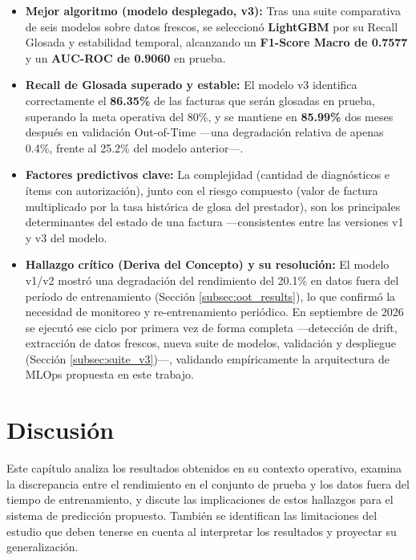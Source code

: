 \documentclass[12pt,letterpaper]{report}
\begin{document}
\begin{tcolorbox}[colback=blue!5, colframe=minsalud, fonttitle=\bfseries, title=Hallazgos Principales del Modelo Predictivo]
\begin{itemize}
    \item \textbf{Mejor algoritmo (modelo desplegado, v3):} Tras una suite comparativa de seis modelos sobre datos frescos, se seleccionó \textbf{LightGBM} por su Recall Glosada y estabilidad temporal, alcanzando un \textbf{F1-Score Macro de 0.7577} y un \textbf{AUC-ROC de 0.9060} en prueba.
    \item \textbf{Recall de Glosada superado y estable:} El modelo v3 identifica correctamente el \textbf{86.35\%} de las facturas que serán glosadas en prueba, superando la meta operativa del 80\%, y se mantiene en \textbf{85.99\%} dos meses después en validación Out-of-Time —una degradación relativa de apenas 0.4\%, frente al 25.2\% del modelo anterior—.
    \item \textbf{Factores predictivos clave:} La complejidad (cantidad de diagnósticos e ítems con autorización), junto con el riesgo compuesto (valor de factura multiplicado por la tasa histórica de glosa del prestador), son los principales determinantes del estado de una factura —consistentes entre las versiones v1 y v3 del modelo.
    \item \textbf{Hallazgo crítico (Deriva del Concepto) y su resolución:} El modelo v1/v2 mostró una degradación del rendimiento del 20.1\% en datos fuera del período de entrenamiento (Sección \ref{subsec:oot_results}), lo que confirmó la necesidad de monitoreo y re-entrenamiento periódico. En septiembre de 2026 se ejecutó ese ciclo por primera vez de forma completa —detección de drift, extracción de datos frescos, nueva suite de modelos, validación y despliegue (Sección \ref{subsec:suite_v3})—, validando empíricamente la arquitectura de MLOps propuesta en este trabajo.
\end{itemize}
\end{tcolorbox}

\chapter{Discusión}

Este capítulo analiza los resultados obtenidos en su contexto operativo, examina la discrepancia entre el rendimiento en el conjunto de prueba y los datos fuera del tiempo de entrenamiento, y discute las implicaciones de estos hallazgos para el sistema de predicción propuesto. También se identifican las limitaciones del estudio que deben tenerse en cuenta al interpretar los resultados y proyectar su generalización.
\end{document}
